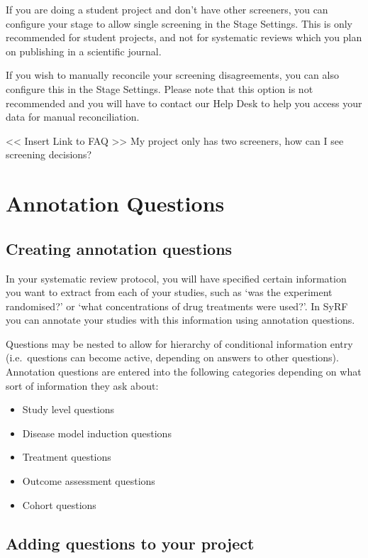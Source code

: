 \documentclass[
]{book}
\providecommand{\tightlist}{%
  \setlength{\itemsep}{0pt}\setlength{\parskip}{0pt}}
\begin{document}
If you are doing a student project and don't have other screeners, you can configure your stage to allow single screening in the Stage Settings. This is only recommended for student projects, and not for systematic reviews which you plan on publishing in a scientific journal.

If you wish to manually reconcile your screening disagreements, you can also configure this in the Stage Settings. Please note that this option is not recommended and you will have to contact our Help Desk to help you access your data for manual reconciliation.

\textless{}\textless{} Insert Link to FAQ \textgreater{}\textgreater{}
My project only has two screeners, how can I see screening decisions?

\hypertarget{annotation}{%
\chapter{Annotation Questions}\label{annotation}}

\hypertarget{creating-annotation-questions}{%
\section{Creating annotation questions}\label{creating-annotation-questions}}

In your systematic review protocol, you will have specified certain information you want to extract from each of your studies, such as `was the experiment randomised?' or `what concentrations of drug treatments were used?'. In SyRF you can annotate your studies with this information using annotation questions.

Questions may be nested to allow for hierarchy of conditional information entry (i.e.~questions can become active, depending on answers to other questions).
Annotation questions are entered into the following categories depending on what sort of information they ask about:

\begin{itemize}
\tightlist
\item
  Study level questions
\item
  Disease model induction questions
\item
  Treatment questions
\item
  Outcome assessment questions
\item
  Cohort questions
\end{itemize}

\hypertarget{adding-questions-to-your-project}{%
\section{Adding questions to your project}\label{adding-questions-to-your-project}}
\end{document}
